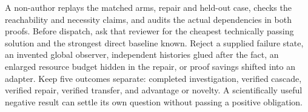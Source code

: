 \documentclass[11pt]{article}
\begin{document}
A non-author replays the matched arms, repair and held-out case, checks the reachability and necessity claims, and audits the actual dependencies in both proofs. Before dispatch, ask that reviewer for the cheapest technically passing solution and the strongest direct baseline known. Reject a supplied failure state, an invented global observer, independent histories glued after the fact, an enlarged resource budget hidden in the repair, or proof savings shifted into an adapter. Keep five outcomes separate: completed investigation, verified cascade, verified repair, verified transfer, and advantage or novelty. A scientifically useful negative result can settle its own question without passing a positive obligation.
\end{document}
